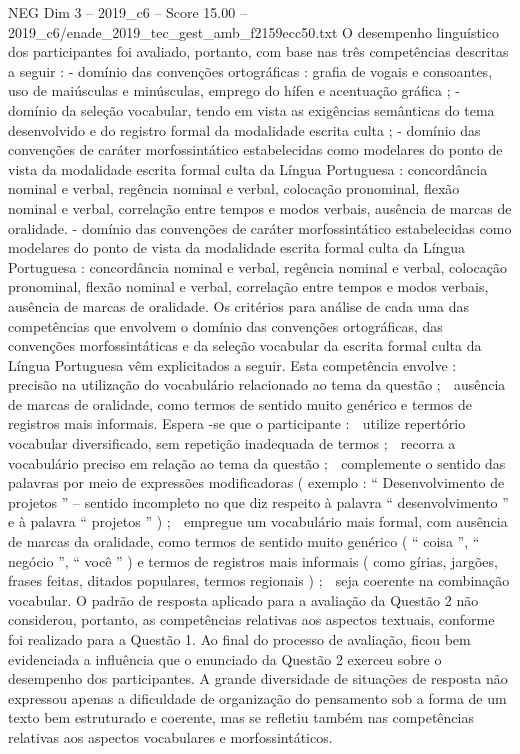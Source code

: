 \begin{textsample}{NEG Dim 3 – 2019\_c6 – Score 15.00 – 2019\_c6/enade\_2019\_tec\_gest\_amb\_f2159ecc50.txt}
O desempenho linguístico dos participantes foi avaliado, portanto, com base nas três competências descritas a seguir : - domínio das convenções ortográficas : grafia de vogais e consoantes, uso de maiúsculas e minúsculas, emprego do hífen e acentuação gráfica ; - domínio da seleção vocabular, tendo em vista as exigências semânticas do tema desenvolvido e do registro formal da modalidade escrita culta ; - domínio das convenções de caráter morfossintático estabelecidas como modelares do ponto de vista da modalidade escrita formal culta da Língua Portuguesa : concordância nominal e verbal, regência nominal e verbal, colocação pronominal, flexão nominal e verbal, correlação entre tempos e modos verbais, ausência de marcas de oralidade. - domínio das convenções de caráter morfossintático estabelecidas como modelares do ponto de vista da modalidade escrita formal culta da Língua Portuguesa : concordância nominal e verbal, regência nominal e verbal, colocação pronominal, flexão nominal e verbal, correlação entre tempos e modos verbais, ausência de marcas de oralidade.
Os critérios para análise de cada uma das competências que envolvem o domínio das convenções ortográficas, das convenções morfossintáticas e da seleção vocabular da escrita formal culta da Língua Portuguesa vêm explicitados a seguir.
Esta competência envolve :  precisão na utilização do vocabulário relacionado ao tema da questão ;  ausência de marcas de oralidade, como termos de sentido muito genérico e termos de registros mais informais.
Espera -se que o participante :  utilize repertório vocabular diversificado, sem repetição inadequada de termos ;  recorra a vocabulário preciso em relação ao tema da questão ;  complemente o sentido das palavras por meio de expressões modificadoras ( exemplo : “ Desenvolvimento de projetos ” – sentido incompleto no que diz respeito à palavra “ desenvolvimento ” e à palavra “ projetos ” ) ;  empregue um vocabulário mais formal, com ausência de marcas da oralidade, como termos de sentido muito genérico ( “ coisa ”, “ negócio ”, “ você ” ) e termos de registros mais informais ( como gírias, jargões, frases feitas, ditados populares, termos regionais ) ;  seja coerente na combinação vocabular.
O padrão de resposta aplicado para a avaliação da Questão 2 não considerou, portanto, as competências relativas aos aspectos textuais, conforme foi realizado para a Questão 1.
Ao final do processo de avaliação, ficou bem evidenciada a influência que o enunciado da Questão 2 exerceu sobre o desempenho dos participantes.
A grande diversidade de situações de resposta não expressou apenas a dificuldade de organização do pensamento sob a forma de um texto bem estruturado e coerente, mas se refletiu também nas competências relativas aos aspectos vocabulares e morfossintáticos.

\end{textsample}
